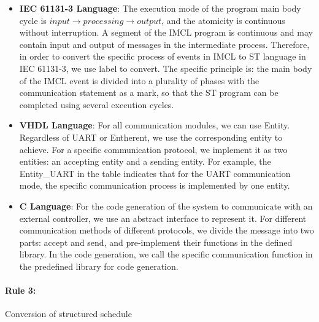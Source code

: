 \begin{itemize}
  \item \textbf{IEC 61131-3 Language}: The execution mode of the program main body cycle is $input\rightarrow processing\rightarrow output$, and the atomicity is continuous without interruption. A segment of the IMCL program is continuous and may contain input and output of messages in the intermediate process. Therefore, in order to convert the specific process of events in IMCL to ST language in IEC 61131-3, we use label to convert. The specific principle is: the main body of the IMCL event is divided into a plurality of phases with the communication statement as a mark, so that the ST program can be completed using several execution cycles.
  \item \textbf{VHDL Language}: For all communication modules, we can use Entity. Regardless of UART or Entherent, we use the corresponding entity to achieve. For a specific communication protocol, we implement it as two entities: an accepting entity and a sending entity. For example, the Entity\_UART in the table indicates that for the UART communication mode, the specific communication process is implemented by one entity.
  \item \textbf{C Language}:  For the code generation of the system to communicate with an external controller, we use an abstract interface to represent it. For different communication methods of different protocols, we divide the message into two parts: accept and send, and pre-implement their functions in the defined library. In the code generation, we call the specific communication function in the predefined library for code generation.
\end{itemize}


\paragraph{\textbf{Rule 3: }} Conversion of structured schedule
